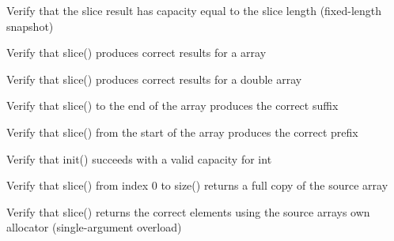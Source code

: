 \begin{DoxyRefList}
%
Verify that the slice result has capacity equal to the slice length (fixed-\/length snapshot)  
\item[Global \doxylink{test__array_8cpp_a5527a74d56cf066f77abb3a11eedc5ed}{TEST\+\_\+F} (\doxylink{classArrayInitTest}{Array\+Init\+Test}, Slice\+Point\+Middle\+Range)]\label{test__test000108}%
%
Verify that slice() produces correct results for a  array  
\item[Global \doxylink{test__array_8cpp_a203c468613b5417aa2a4d903144d687e}{TEST\+\_\+F} (\doxylink{classArrayInitTest}{Array\+Init\+Test}, Slice\+Double\+Middle\+Range)]\label{test__test000107}%
%
Verify that slice() produces correct results for a double array  
\item[Global \doxylink{test__array_8cpp_abe253726e66fd72caee2742a8a38431e}{TEST\+\_\+F} (\doxylink{classArrayInitTest}{Array\+Init\+Test}, Slice\+Int\+To\+End)]\label{test__test000106}%
%
Verify that slice() to the end of the array produces the correct suffix  
\item[Global \doxylink{test__array_8cpp_a46e3217225d008a0c5cb44ac9b96e019}{TEST\+\_\+F} (\doxylink{classArrayInitTest}{Array\+Init\+Test}, Slice\+Int\+From\+Start)]\label{test__test000105}%
%
Verify that slice() from the start of the array produces the correct prefix  
\item[Global \doxylink{test__array_8cpp_a45a322b2b2e80146932d3dadf08c45ff}{TEST\+\_\+F} (\doxylink{classArrayInitTest}{Array\+Init\+Test}, Init\+Int\+Succeeds)]\label{test__test000001}%
%
Verify that init() succeeds with a valid capacity for int  
\item[Global \doxylink{test__array_8cpp_afd55fd5cc85f3b1d162a4b555669f4ed}{TEST\+\_\+F} (\doxylink{classArrayInitTest}{Array\+Init\+Test}, Slice\+Int\+Full\+Range)]\label{test__test000103}%
%
Verify that slice() from index 0 to size() returns a full copy of the source array  
\item[Global \doxylink{test__array_8cpp_ac288c6557506c5396146a87532d43e40}{TEST\+\_\+F} (\doxylink{classArrayInitTest}{Array\+Init\+Test}, Slice\+Int\+Middle\+Range\+With\+Source\+Allocator)]\label{test__test000102}%
%
Verify that slice() returns the correct elements using the source array\textquotesingle{}s own allocator (single-\/argument overload)  
\item[Global \doxylink{test__array_8cpp_ad38c6344ee9d3e1c466562c827e27dab}{TEST\+\_\+F} (\doxylink{classArrayInitTest}{Array\+Init\+Test}, Slice\+Int\+Middle\+Range\+With\+Allocator)]\label{test__test000101}%

\end{DoxyRefList}
